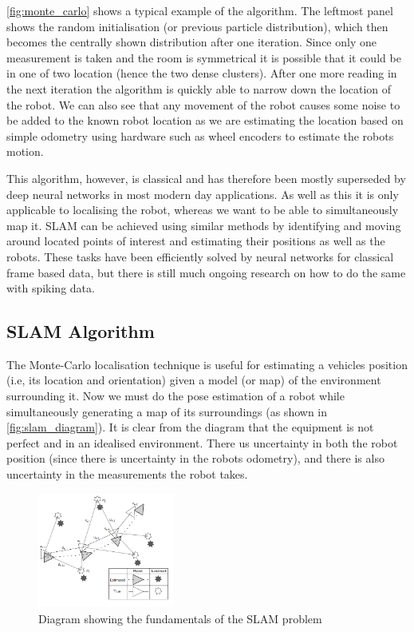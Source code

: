 \autoref{fig:monte_carlo} shows a typical example of the algorithm. The leftmost panel shows the random initialisation (or previous particle distribution), which then becomes the centrally shown distribution after one iteration. Since only one measurement is taken and the room is symmetrical it is possible that it could be in one of two location (hence the two dense clusters). After one more reading in the next iteration the algorithm is quickly able to narrow down the location of the robot. We can also see that any movement of the robot causes some noise to be added to the known robot location as we are estimating the location based on simple odometry using hardware such as wheel encoders to estimate the robots motion.

This algorithm, however, is classical and has therefore been mostly superseded by deep neural networks in most modern day applications. As well as this it is only applicable to localising the robot, whereas we want to be able to simultaneously map it. SLAM can be achieved using similar methods by identifying and moving around located points of interest and estimating their positions as well as the robots. These tasks have been efficiently solved by neural networks for classical frame based data, but there is still much ongoing research on how to do the same with spiking data.

\subsection{SLAM Algorithm}

The Monte-Carlo localisation technique is useful for estimating a vehicles position (i.e, its location and orientation) given a model (or map) of the environment surrounding it. Now we must do the pose estimation of a robot while simultaneously generating a map of its surroundings (as shown in \autoref{fig:slam_diagram}). It is clear from the diagram that the equipment is not perfect and in an idealised environment. There us uncertainty in both the robot position (since there is uncertainty in the robots odometry), and there is also uncertainty in the measurements the robot takes.

\begin{figure}[htb]
      \centering
      \includegraphics[width=0.4\textwidth]{background/images/slam_diagram.png}
      \caption{Diagram showing the fundamentals of the SLAM problem\cite{BasicSlam}}
      \label{fig:slam_diagram}
\end{figure}

